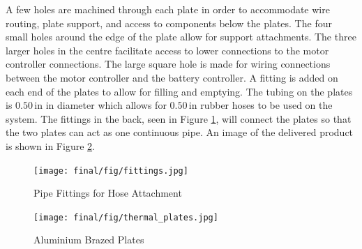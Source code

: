 \documentclass[11pt]{article}
\numberwithin{equation}{subsection} %
\newcommand{\unit}[1]{\ensuremath{\, \mathrm{#1}}}             %
\begin{document}
A few holes are machined through each plate in order to accommodate wire routing, plate support, and access to components below the plates. The four small holes around the edge of the plate allow for support attachments. The three larger holes in the centre facilitate access to lower connections to the motor controller connections. The large square hole is made for wiring connections between the motor controller and the battery controller. A fitting is added on each end of the plates to allow for filling and emptying. The tubing on the plates is $0.50\unit{in}$ in diameter which allows for $0.50\unit{in}$ rubber hoses to be used on the system. The fittings in the back, seen in Figure \ref{fig:fittings}, will connect the plates so that the two plates can act as one continuous pipe. An image of the delivered product is shown in Figure \ref{fig:plates}.



\begin{figure}[!htb]
    \centering
    \texttt{[image: final/fig/fittings.jpg]}
    \caption{Pipe Fittings for Hose Attachment}
    \label{fig:fittings}
\end{figure}
 
\begin{figure}[!htb]
 \centering
	\texttt{[image: final/fig/thermal\_plates.jpg]}
    \caption{Aluminium Brazed Plates}
    \label{fig:plates}
\end{figure}
\end{document}
